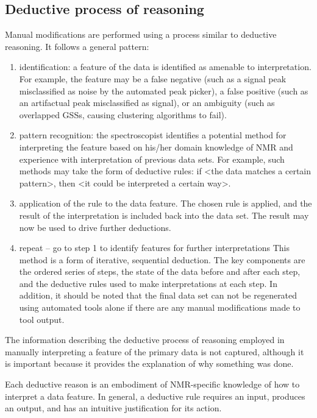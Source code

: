 \subsection*{Deductive process of reasoning}
Manual modifications are performed using a process similar to deductive 
reasoning.  It follows a general pattern:
\begin{enumerate}
  \item identification: a feature of the data is identified as amenable to 
    interpretation.  For example, the feature may be a false negative (such as 
    a signal peak misclassified as noise by the automated peak picker), a false 
    positive (such as an artifactual peak misclassified as signal), or an 
    ambiguity (such as overlapped GSSs, causing clustering algorithms to fail).
  \item pattern recognition: the spectroscopist identifies a potential method 
    for interpreting the feature based on his/her domain knowledge of NMR and 
    experience with interpretation of previous data sets.  For example, such 
    methods may take the form of deductive rules:  if <the data matches a 
    certain pattern>, then <it could be interpreted a certain way>. 
  \item application of the rule to the data feature.  The chosen rule is 
    applied, and the result of the interpretation is included back into the 
    data set.  The result may now be used to drive further deductions.
  \item repeat -- go to step 1 to identify features for further interpretations
    This method is a form of iterative, sequential deduction.  The key components 
    are the ordered series of steps, the state of the data before and after each 
    step, and the deductive rules used to make interpretations at each step.  
    In addition, it should be noted that the final data set can not be 
    regenerated using automated tools alone if there are any manual 
    modifications made to tool output.
\end{enumerate}

The information describing the deductive process of reasoning employed in 
manually interpreting a feature of the primary data is not captured, although
it is important because it provides the explanation 
of why something was done.

Each deductive reason is an embodiment of NMR-specific knowledge of how to 
interpret a data feature.  In general, a deductive rule requires an input, 
produces an output, and has an intuitive justification for its action.

